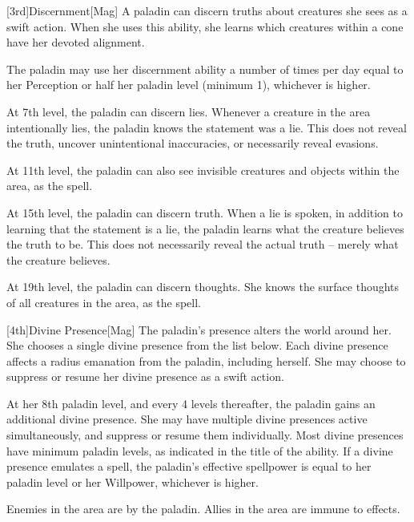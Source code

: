         [3rd]{Discernment}[Mag]
        A paladin can discern truths about creatures she sees as a swift action.
        When she uses this ability, she learns which creatures within a \arealarge cone have her devoted alignment.

        The paladin may use her discernment ability a number of times per day equal to her Perception or half her paladin level (minimum 1), whichever is higher.

        At 7th level, the paladin can discern lies.
        Whenever a creature in the area intentionally lies, the paladin knows the statement was a lie.
        This does not reveal the truth, uncover unintentional inaccuracies, or necessarily reveal evasions.

        At 11th level, the paladin can also see invisible creatures and objects within the area, as the  spell.

        At 15th level, the paladin can discern truth.
        When a lie is spoken, in addition to learning that the statement is a lie, the paladin learns what the creature believes the truth to be.
        This does not necessarily reveal the actual truth -- merely what the creature believes.

        At 19th level, the paladin can discern thoughts.
        She knows the surface thoughts of all creatures in the area, as the  spell.

        [4th]{Divine Presence}[Mag]
        The paladin's presence alters the world around her.
        She chooses a single divine presence from the list below.
        Each divine presence affects a \areamed radius emanation from the paladin, including herself.
        She may choose to suppress or resume her divine presence as a swift action.

        At her 8th paladin level, and every 4 levels thereafter, the paladin gains an additional divine presence.
        She may have multiple divine presences active simultaneously, and suppress or resume them individually.
        Most divine presences have minimum paladin levels, as indicated in the title of the ability.
        If a divine presence emulates a spell, the paladin's effective spellpower is equal to her paladin level or her Willpower, whichever is higher.

        Enemies in the area are \goaded by the paladin.
        Allies in the area are immune to  effects.


